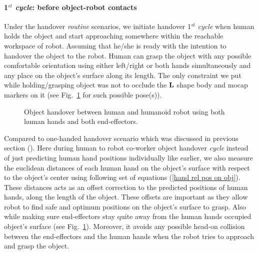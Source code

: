\paragraph*{1$^{st}$ \textit{cycle}: before object-robot contacts}

Under the handover \textit{routine} scenarios, we initiate handover 1$^{st}$ \textit{cycle} when human holds the object and start approaching somewhere within the reachable workspace of robot. Assuming that he/she is ready with the intention to handover the object to the robot. Human can grasp the object with any possible comfortable orientation using either left/right or both hands simultaneously and any place on the object's surface along its length. The only constraint we put while holding/grasping object was not to occlude the ${\bf L}$ shape body and mocap markers on it (see Fig.~\ref{fig:h-r-pipe-handover} for such possible pose(s)).


\begin{figure}[hptb]
	\caption{Object handover between human and humanoid robot using both human hands and both end-effectors.}
	\label{fig:h-r-pipe-handover}
\end{figure}

Compared to one-handed handover scenario which was discussed in previous section (). Here during human to robot co-worker object handover \textit{cycle} instead of just predicting human hand positions individually like earlier, we also measure the euclidean distances of each human hand on the object's surface with respect to the object's center using following set of equations (\ref{hand rel pos on obj}). These distances acts as an offset correction to the predicted positions of human hands, along the length of the object. These offsets are important as they allow robot to find safe and optimum positions on the object's surface to grasp. Also while making sure end-effectors stay quite away from the human hands occupied object's surface (see Fig.~\ref{fig:h-r-pipe-handover}). Moreover, it avoids any possible head-on collision between the end-effectors and the human hands when the robot tries to approach and grasp the object.


